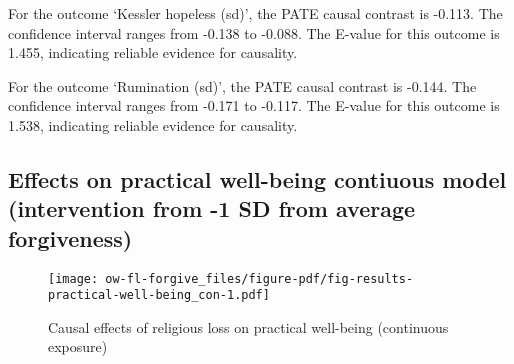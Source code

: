 \documentclass[
  singlecolumn]{report}
\begin{document}
For the outcome `Kessler hopeless (sd)', the PATE causal contrast is
-0.113. The confidence interval ranges from -0.138 to -0.088. The
E-value for this outcome is 1.455, indicating reliable evidence for
causality.

For the outcome `Rumination (sd)', the PATE causal contrast is -0.144.
The confidence interval ranges from -0.171 to -0.117. The E-value for
this outcome is 1.538, indicating reliable evidence for causality.

\hypertarget{effects-on-practical-well-being-contiuous-model-intervention-from--1-sd-from-average-forgiveness}{%
\subsection{Effects on practical well-being contiuous model
(intervention from -1 SD from average
forgiveness)}\label{effects-on-practical-well-being-contiuous-model-intervention-from--1-sd-from-average-forgiveness}}

\begin{figure}

{\centering \texttt{[image: ow-fl-forgive\_files/figure-pdf/fig-results-practical-well-being\_con-1.pdf]}

}

\caption{\label{fig-results-practical-well-being_con}Causal effects of
religious loss on practical well-being (continuous exposure)}

\end{figure}
\end{document}
